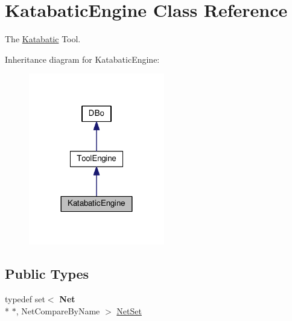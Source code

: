 \hypertarget{classKatabatic_1_1KatabaticEngine}{\section{Katabatic\-Engine Class Reference}
\label{classKatabatic_1_1KatabaticEngine}
}


The \hyperlink{namespaceKatabatic}{Katabatic} Tool.  




Inheritance diagram for Katabatic\-Engine\-:\nopagebreak
\begin{figure}[H]
\begin{center}
\leavevmode
\includegraphics[width=168pt]{classKatabatic_1_1KatabaticEngine__inherit__graph}
\end{center}
\end{figure}
\subsection*{Public Types}
\begin{DoxyCompactItemize}
\item 
typedef set$<$ {\bf Net} \\*
$\ast$, Net\-Compare\-By\-Name $>$ \hyperlink{classKatabatic_1_1KatabaticEngine_a92ed88f9aecd2f195089c4029fa8bcc7}{Net\-Set}
\end{DoxyCompactItemize}
